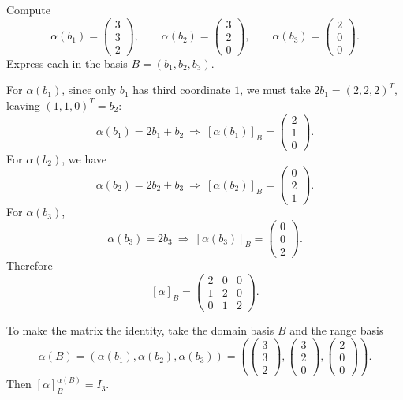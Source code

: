 \begin{solution}
Compute
\[
\alpha(b_1)=\begin{pmatrix}3\\3\\2\end{pmatrix},\qquad
\alpha(b_2)=\begin{pmatrix}3\\2\\0\end{pmatrix},\qquad
\alpha(b_3)=\begin{pmatrix}2\\0\\0\end{pmatrix}.
\]
Express each in the basis $B=(b_1,b_2,b_3)$.

For $\alpha(b_1)$, since only $b_1$ has third coordinate $1$, we must take $2b_1=(2,2,2)^T$, leaving $(1,1,0)^T=b_2$:
\[
\alpha(b_1)=2b_1+b_2 \ \Rightarrow\ [\alpha(b_1)]_B=\begin{pmatrix}2\\1\\0\end{pmatrix}.
\]
For $\alpha(b_2)$, we have
\[
\alpha(b_2)=2b_2+b_3 \ \Rightarrow\ [\alpha(b_2)]_B=\begin{pmatrix}0\\2\\1\end{pmatrix}.
\]
For $\alpha(b_3)$,
\[
\alpha(b_3)=2b_3 \ \Rightarrow\ [\alpha(b_3)]_B=\begin{pmatrix}0\\0\\2\end{pmatrix}.
\]
Therefore
\[
[\alpha]_B=
\begin{pmatrix}
	2&0&0\\
	1&2&0\\
	0&1&2
\end{pmatrix}.
\]

To make the matrix the identity, take the domain basis $B$ and the range basis
\[
\alpha(B)=(\alpha(b_1),\alpha(b_2),\alpha(b_3))
=\left(
\begin{pmatrix}3\\3\\2\end{pmatrix},
\begin{pmatrix}3\\2\\0\end{pmatrix},
\begin{pmatrix}2\\0\\0\end{pmatrix}
\right).
\]
Then $[\alpha]_{B}^{\alpha(B)}=I_3$.

\bigskip
\end{solution}

